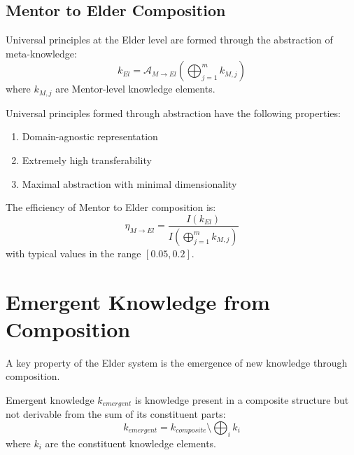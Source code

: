 \subsection{Mentor to Elder Composition}

\begin{definition}
Universal principles at the Elder level are formed through the abstraction of meta-knowledge:
\begin{equation}
k_{El} = \mathcal{A}_{M \rightarrow El}\left(\bigoplus_{j=1}^{m} k_{M,j}\right)
\end{equation}
where $k_{M,j}$ are Mentor-level knowledge elements.
\end{definition}

\begin{theorem}
Universal principles formed through abstraction have the following properties:
\begin{enumerate}
    \item Domain-agnostic representation
    \item Extremely high transferability
    \item Maximal abstraction with minimal dimensionality
\end{enumerate}
\end{theorem}

\begin{theorem}
The efficiency of Mentor to Elder composition is:
\begin{equation}
\eta_{M \rightarrow El} = \frac{I(k_{El})}{I\left(\bigoplus_{j=1}^{m} k_{M,j}\right)}
\end{equation}
with typical values in the range $[0.05, 0.2]$.
\end{theorem}

\section{Emergent Knowledge from Composition}



A key property of the Elder system is the emergence of new knowledge through composition.

\begin{definition}
Emergent knowledge $k_{emergent}$ is knowledge present in a composite structure but not derivable from the sum of its constituent parts:
\begin{equation}
k_{emergent} = k_{composite} \setminus \bigoplus_{i} k_i
\end{equation}
where $k_i$ are the constituent knowledge elements.
\end{definition}


